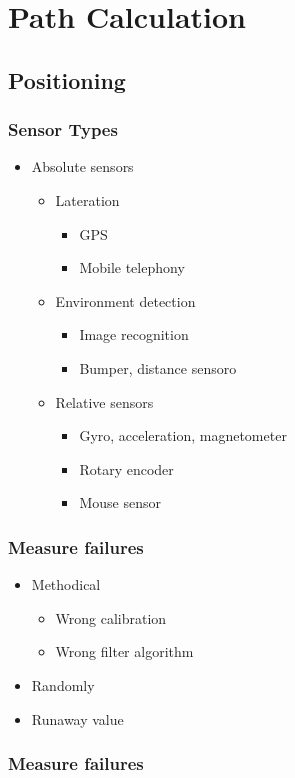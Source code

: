 \section{Path Calculation}


\subsection{Positioning}


\frame
{
\frametitle{Sensor Types}

\begin{itemize}
\item Absolute sensors
	\begin{itemize}
	\item Lateration
		\begin{itemize}
		\item GPS
		\item Mobile telephony
		\end{itemize}
	\item Environment detection
		\begin{itemize}
		\item Image recognition
		\item Bumper, distance sensoro
		\end{itemize}
	\item Relative sensors
		\begin{itemize}
		\item Gyro, acceleration, magnetometer
		\item Rotary encoder
		\item Mouse sensor
		\end{itemize}
	\end{itemize}
\end{itemize}
}


\frame
{
\frametitle{Measure failures}

\begin{itemize}
\item Methodical
	\begin{itemize}
	\item Wrong calibration
	\item Wrong filter algorithm
	\end{itemize}
\item Randomly
\item Runaway value
\end{itemize}
}


\frame
{
\frametitle{Measure failures}
\makebox[\textwidth][c]{
\resizebox{0.75\textwidth}{!}{

}
}
}


